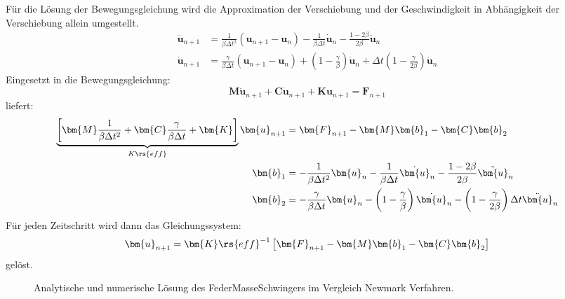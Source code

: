 \documentclass[letterpaper,10pt,german]{jupyterBook}
\let\sphinxpxdimen\pdfpxdimen\else\newdimen\sphinxpxdimen
\begin{document}
\sphinxAtStartPar
Für die Lösung der Bewegungsgleichung wird die Approximation der Verschiebung und der Geschwindigkeit in Abhängigkeit der Verschiebung allein umgestellt.
\label{equation:chapters/chapter6/TransienteDynamik:81a04826-7cc2-4c38-9107-8b2337eff161}\begin{align}
 \ddot{\bm{u}}_{n+1} & = \frac{1}{\beta \Delta t^2} \left( \bm{u}_{n+1} - \bm{u}_n \right) - \frac{1}{\beta \Delta t} \dot{\bm{u}}_n -  \frac{1-2\beta} {2\beta} \ddot{\bm{u}}_n \\
\dot{\bm{u}}_{n+1} & = \frac{\gamma}{\beta \Delta t} \left( \bm{u}_{n+1} - \bm{u}_n\right) + \left(1-\frac{\gamma}{\beta}\right) \dot{\bm{u}}_n + \Delta t \left(1-\frac{\gamma}{2\beta}\right) \ddot{\bm{u}}_n
\end{align}
\sphinxAtStartPar
Eingesetzt in die Bewegungsgleichung:
\begin{equation*}
\bm{M} \ddot{\bm{u}}_{n+1} + \bm{C} \dot{\bm{u}}_{n+1} + \bm{K} \bm{u}_{n+1} = \bm{F}_{n+1}
\end{equation*}
\sphinxAtStartPar
liefert:
\label{equation:chapters/chapter6/TransienteDynamik:c4c6e2bc-0efe-4b45-af0d-fbed97c887f4}\begin{align}
\underbrace{\left[\bm{M} \frac{1}{\beta \Delta t^2} + \bm{C} \frac{\gamma}{\beta \Delta t}+ \bm{K}\right]}_{K\rs{eff}} \bm{u}_{n+1} &= \bm{F}_{n+1} - \bm{M} \bm{b}_1 - \bm{C} \bm{b}_2 \\
\bm{b}_1 & = -\frac{1}{\beta \Delta t^2} \bm{u}_n- \frac{1}{\beta \Delta t} \dot{\bm{u}}_n - \frac{1-2\beta}{2 \beta} \ddot{\bm{u}}_n \\
\bm{b}_2 &= -\frac{\gamma}{\beta \Delta t} \bm{u}_n - \left( 1- \frac{\gamma}{\beta} \right)\dot{\bm{u}}_n - \left(1-\frac{\gamma}{2\beta}\right) \Delta t \ddot{\bm{u}}_n
\end{align}
\sphinxAtStartPar
Für jeden Zeitschritt wird dann das Gleichungssystem:
\label{equation:chapters/chapter6/TransienteDynamik:b090508b-11c8-48b3-8c3d-2d6baa6f77e4}\begin{equation}
\bm{u}_{n+1} = \bm{K}\rs{eff}^{-1} \left[ \bm{F}_{n+1} - \bm{M} \bm{b}_1 - \bm{C} \bm{b}_2 \right]
\end{equation}
\sphinxAtStartPar
gelöst.

\begin{figure}[htbp]
\centering
\capstart

\noindent\sphinxincludegraphics[width=500\sphinxpxdimen]{{Federschwinger_NM}.png}
\caption{Analytische und numerische Lösung des Feder\sphinxhyphen{}Masse\sphinxhyphen{}Schwingers im Vergleich \sphinxhyphen{} Newmark Verfahren.}\label{\detokenize{chapters/chapter6/TransienteDynamik:loesung-federmasseschwinger-numerisch-nm}}\end{figure}
\end{document}
